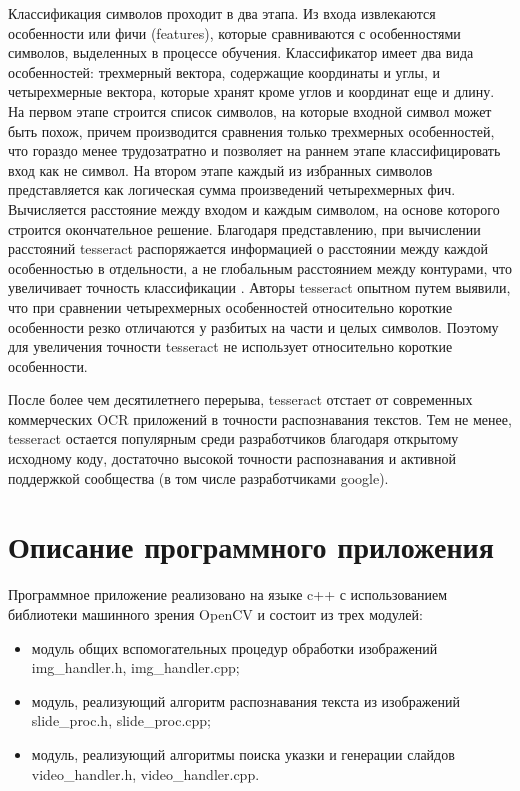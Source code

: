 \documentclass[oneside,final,14pt]{extreport}
\begin{document}
Классификация символов проходит в два этапа. Из входа извлекаются особенности или фичи (features), которые сравниваются с особенностями символов, выделенных в процессе обучения. Классификатор имеет два вида особенностей: трехмерный вектора, содержащие координаты и углы, и четырехмерные вектора, которые хранят кроме углов и координат еще и длину. На первом этапе строится список символов, на которые входной символ может быть похож, причем производится сравнения только трехмерных особенностей, что гораздо менее трудозатратно и позволяет  на раннем этапе классифицировать вход как не символ. На втором этапе каждый из избранных символов представляется как логическая сумма произведений четырехмерных фич. Вычисляется расстояние между входом и каждым символом, на основе которого строится окончательное решение. Благодаря представлению, при вычислении расстояний tesseract распоряжается информацией о расстоянии между каждой особенностью в отдельности, а не глобальным расстоянием между контурами, что увеличивает точность классификации .  Авторы tesseract опытном путем выявили, что при сравнении четырехмерных особенностей относительно короткие особенности резко отличаются у разбитых на части и целых символов. Поэтому для увеличения точности tesseract не использует относительно короткие особенности. 

После более чем десятилетнего перерыва, tesseract отстает от современных коммерческих OCR приложений в точности распознавания текстов. Тем не менее, tesseract остается популярным среди разработчиков благодаря открытому исходному коду, достаточно высокой точности распознавания и активной поддержкой сообщества (в том числе разработчиками google). 
\section{Описание программного приложения}
Программное приложение реализовано на языке c++ с использованием библиотеки машинного зрения OpenCV и состоит из трех модулей:
\begin{itemize}
\item модуль общих вспомогательных процедур обработки изображений img\_handler.h, img\_handler.cpp;
\item модуль, реализующий алгоритм распознавания текста из изображений slide\_proc.h, slide\_proc.cpp;
\item модуль, реализующий алгоритмы поиска указки и генерации слайдов video\_handler.h, video\_handler.cpp.
\end{itemize}
\end{document}

